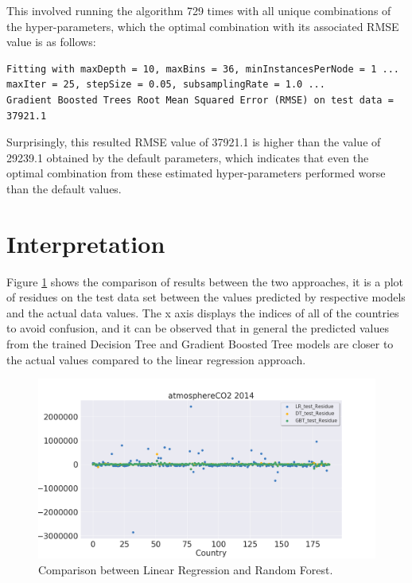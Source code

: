 \documentclass[11pt,a4paper,titlepage]{article}
\begin{document}
This involved running the algorithm 729 times with all unique combinations of the hyper-parameters, which the optimal combination with its associated RMSE value is as follows:

\begin{verbatim}
Fitting with maxDepth = 10, maxBins = 36, minInstancesPerNode = 1 ...
maxIter = 25, stepSize = 0.05, subsamplingRate = 1.0 ...
Gradient Boosted Trees Root Mean Squared Error (RMSE) on test data = 37921.1
\end{verbatim}

Surprisingly, this resulted RMSE value of 37921.1 is higher than the value of 29239.1 obtained by the default parameters, which indicates that even the optimal combination from these estimated hyper-parameters performed worse than the default values.

\section{Interpretation}

Figure \ref{fig:atmosphereCO2_test_residue} shows the comparison of results between the two approaches, it is a plot of residues on the test data set between the values predicted by respective models and the actual data values. The x axis displays the indices of all of the countries to avoid confusion, and it can be observed that in general the predicted values from the trained Decision Tree and Gradient Boosted Tree models are closer to the actual values compared to the linear regression approach.

\begin{figure}[!htbp]
    \begin{center}
        \includegraphics[width=\textwidth]{../Plots/atmosphereCO2_test_residue.png}
        \caption{Comparison between Linear Regression and Random Forest.}
        \label{fig:atmosphereCO2_test_residue}
    \end{center}
\end{figure}
\end{document}
